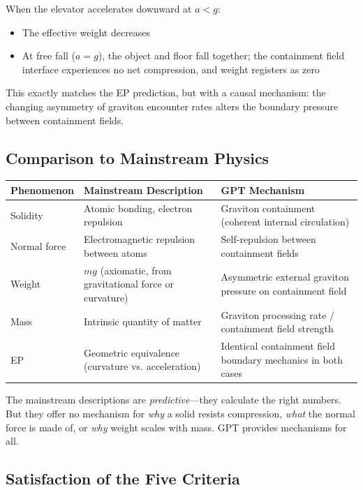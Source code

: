 \documentclass[12pt, a4paper]{article}
\begin{document}
When the elevator accelerates downward at \( a < g \):

\begin{itemize}
    \item The effective weight decreases
    \item At free fall (\( a = g \)), the object and floor fall together; the containment field interface experiences no net compression, and weight registers as zero
\end{itemize}

This exactly matches the EP prediction, but with a causal mechanism: the changing asymmetry of graviton encounter rates alters the boundary pressure between containment fields.

\subsection{Comparison to Mainstream Physics}
\label{subsec:weight_comparison}

\begin{center}
\begin{tabular}{|p{3.5cm}|p{5cm}|p{5cm}|}
\hline
\textbf{Phenomenon} & \textbf{Mainstream Description} & \textbf{GPT Mechanism} \\
\hline
Solidity & Atomic bonding, electron repulsion & Graviton containment (coherent internal circulation) \\
\hline
Normal force & Electromagnetic repulsion between atoms & Self-repulsion between containment fields \\
\hline
Weight & \( mg \) (axiomatic, from gravitational force or curvature) & Asymmetric external graviton pressure on containment field \\
\hline
Mass & Intrinsic quantity of matter & Graviton processing rate / containment field strength \\
\hline
EP & Geometric equivalence (curvature vs. acceleration) & Identical containment field boundary mechanics in both cases \\
\hline
\end{tabular}
\end{center}

The mainstream descriptions are \textit{predictive}—they calculate the right numbers. But they offer no mechanism for \textit{why} a solid resists compression, \textit{what} the normal force is made of, or \textit{why} weight scales with mass. GPT provides mechanisms for all.

\subsection{Satisfaction of the Five Criteria}
\label{subsec:weight_criteria}
\end{document}
